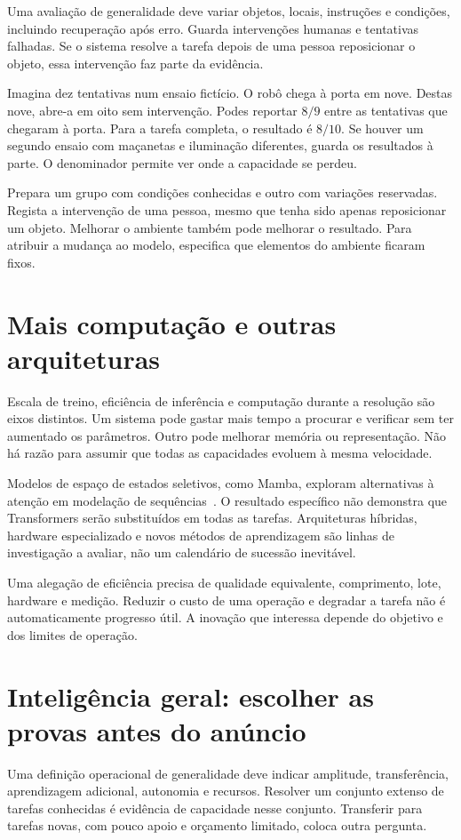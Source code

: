 Uma avaliação de generalidade deve variar objetos, locais, instruções e condições, incluindo recuperação após erro. Guarda intervenções humanas e tentativas falhadas. Se o sistema resolve a tarefa depois de uma pessoa reposicionar o objeto, essa intervenção faz parte da evidência.

Imagina dez tentativas num ensaio fictício. O robô chega à porta em nove. Destas nove, abre-a em oito sem intervenção. Podes reportar $8/9$ entre as tentativas que chegaram à porta. Para a tarefa completa, o resultado é $8/10$. Se houver um segundo ensaio com maçanetas e iluminação diferentes, guarda os resultados à parte. O denominador permite ver onde a capacidade se perdeu.

Prepara um grupo com condições conhecidas e outro com variações reservadas. Regista a intervenção de uma pessoa, mesmo que tenha sido apenas reposicionar um objeto. Melhorar o ambiente também pode melhorar o resultado. Para atribuir a mudança ao modelo, especifica que elementos do ambiente ficaram fixos.

\section{Mais computação e outras arquiteturas}
Escala de treino, eficiência de inferência e computação durante a resolução são eixos distintos. Um sistema pode gastar mais tempo a procurar e verificar sem ter aumentado os parâmetros. Outro pode melhorar memória ou representação. Não há razão para assumir que todas as capacidades evoluem à mesma velocidade.

Modelos de espaço de estados seletivos, como Mamba, exploram alternativas à atenção em modelação de sequências~\citep{gu2023}. O resultado específico não demonstra que Transformers serão substituídos em todas as tarefas. Arquiteturas híbridas, hardware especializado e novos métodos de aprendizagem são linhas de investigação a avaliar, não um calendário de sucessão inevitável.

Uma alegação de eficiência precisa de qualidade equivalente, comprimento, lote, hardware e medição. Reduzir o custo de uma operação e degradar a tarefa não é automaticamente progresso útil. A inovação que interessa depende do objetivo e dos limites de operação.

\section{Inteligência geral: escolher as provas antes do anúncio}
Uma definição operacional de generalidade deve indicar amplitude, transferência, aprendizagem adicional, autonomia e recursos. Resolver um conjunto extenso de tarefas conhecidas é evidência de capacidade nesse conjunto. Transferir para tarefas novas, com pouco apoio e orçamento limitado, coloca outra pergunta.

